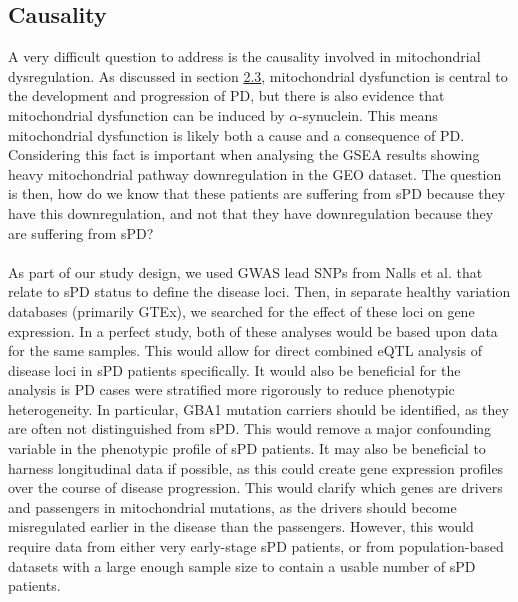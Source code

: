 \documentclass{article}
\begin{document}
\subsection{Causality}
\label{subsubsec:causality}
A very difficult question to address is the causality involved in mitochondrial dysregulation. As discussed in section \hyperref[subsubsec:mitochondria]{2.3}, mitochondrial dysfunction is central to the development and progression of PD\cite{Bartman2024MitochondrialDiseases}\cite{MoradiVastegani2023MitochondrialStrategies}, but there is also evidence that mitochondrial dysfunction can be induced by $\alpha$-synuclein\cite{Sohrabi2023CommonDisease.}. This means mitochondrial dysfunction is likely both a cause and a consequence of PD. Considering this fact is important when analysing the GSEA results showing heavy mitochondrial pathway downregulation in the GEO dataset. The question is then, how do we know that these patients are suffering from sPD because they have this downregulation, and not that they have downregulation because they are suffering from sPD? 
\\
\\As part of our study design, we used GWAS lead SNPs from Nalls et al.\cite{Nalls2019IdentificationStudies} that relate to sPD status to define the disease loci. Then, in separate healthy variation databases (primarily GTEx\cite{Aguet2020TheTissues}), we searched for the effect of these loci on gene expression. In a perfect study, both of these analyses would be based upon data for the same samples. This would allow for direct combined eQTL analysis of disease loci in sPD patients specifically. It would also be beneficial for the analysis is PD cases were stratified more rigorously to reduce phenotypic heterogeneity. In particular, GBA1 mutation carriers should be identified, as they are often not distinguished from sPD\cite{Milenkovic2022GBADisease.}. This would remove a major confounding variable in the phenotypic profile of sPD patients. It may also be beneficial to harness longitudinal data if possible, as this could create gene expression profiles over the course of disease progression. This would clarify which genes are drivers and passengers in mitochondrial mutations, as the drivers should become misregulated earlier in the disease than the passengers. However, this would require data from either very early-stage sPD patients, or from population-based datasets with a large enough sample size to contain a usable number of sPD patients.
\end{document}
